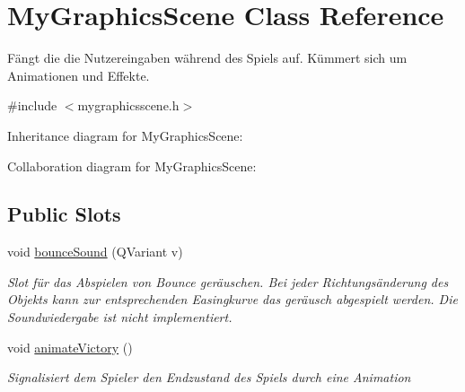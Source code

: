 \hypertarget{class_my_graphics_scene}{\section{My\-Graphics\-Scene Class Reference}
\label{class_my_graphics_scene}
}


Fängt die die Nutzereingaben während des Spiels auf. Kümmert sich um Animationen und Effekte.  




{\ttfamily \#include $<$mygraphicsscene.\-h$>$}



Inheritance diagram for My\-Graphics\-Scene\-:


Collaboration diagram for My\-Graphics\-Scene\-:
\subsection*{Public Slots}
\begin{DoxyCompactItemize}
\item 
void \hyperlink{class_my_graphics_scene_ae13be07253c9d3ff11c336c09cd89daf}{bounce\-Sound} (Q\-Variant v)
\begin{DoxyCompactList}\small\item\em Slot für das Abspielen von Bounce geräuschen. Bei jeder Richtungsänderung des Objekts kann zur entsprechenden Easingkurve das geräusch abgespielt werden. Die Soundwiedergabe ist nicht implementiert. \end{DoxyCompactList}\item 
void \hyperlink{class_my_graphics_scene_a47693d863886396ee37b3bec05ac341f}{animate\-Victory} ()
\begin{DoxyCompactList}\small\item\em Signalisiert dem Spieler den Endzustand des Spiels durch eine Animation \end{DoxyCompactList}\end{DoxyCompactItemize}
